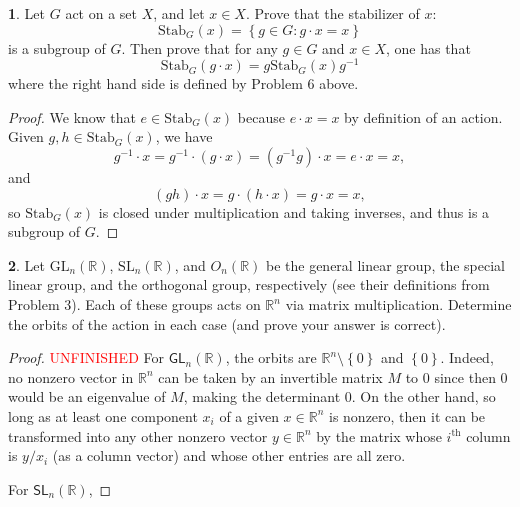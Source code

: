 \documentclass[12pt]{article}
\theoremstyle{definition}
\newtheorem{ex}{}
\begin{document}
\begin{ex}
	Let $G$ act on a set $X$, and let $x \in X$.
	Prove that the stabilizer of $x$: \begin{equation*}
		\mathrm{Stab}_G(x) = \left\lbrace g \in G : g \cdot x = x \right\rbrace
	\end{equation*}
	is a subgroup of $G$.
	Then prove that for any $g \in G$ and $x \in X$, one has that \begin{equation*}
		\mathrm{Stab}_G(g \cdot x) = g \mathrm{Stab}_G(x)g^{-1}
	\end{equation*}
	where the right hand side is defined by Problem 6 above.
\end{ex}
\begin{proof}
  We know that $e \in \mathrm{Stab}_G(x)$ because $e\cdot x = x$ by definition of an action.
  Given $g, h \in \mathrm{Stab}_G(x)$, we have \begin{equation*}
    g^{-1}\cdot x = g^{-1} \cdot (g \cdot x) = (g^{-1}g) \cdot x = e \cdot x = x,
  \end{equation*}
  and \begin{equation*}
    (gh) \cdot x = g \cdot (h \cdot x) = g \cdot x = x,
  \end{equation*}
  so $\mathrm{Stab}_G(x)$ is closed under multiplication and taking inverses, and thus is a subgroup of $G$.
\end{proof}

\begin{ex}
	Let $\mathrm{GL}_n(\mathbb{R})$, $\mathrm{SL}_n(\mathbb{R})$, and $O_n(\mathbb{R})$ be the general linear group, the special linear group, and the orthogonal group, respectively (see their definitions from Problem 3).
	Each of these groups acts on $\mathbb{R}^n$ via matrix multiplication.
	Determine the orbits of the action in each case (and prove your answer is correct).
\end{ex}
\begin{proof}
  \textcolor{red}{UNFINISHED}
  For $\mathsf{GL}_n(\mathbb{R})$, the orbits are $\mathbb{R}^n \setminus \left\lbrace 0 \right\rbrace$ and $\left\lbrace 0 \right\rbrace$.
  Indeed, no nonzero vector in $\mathbb{R}^n$ can be taken by an invertible matrix $M$ to 0 since then 0 would be an eigenvalue of $M$, making the determinant 0.
  On the other hand, so long as at least one component $x_i$ of a given $x \in \mathbb{R}^n$ is nonzero, then it can be transformed into any other nonzero vector $y \in \mathbb{R}^n$ by the matrix whose $i^{\text{th}}$ column is $y/x_i$ (as a column vector) and whose other entries are all zero.

  For $\mathsf{SL}_n(\mathbb{R})$, 
\end{proof}
\end{document}
